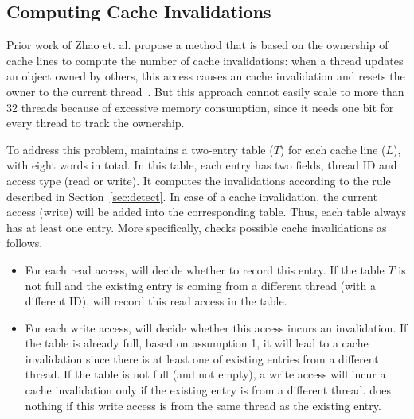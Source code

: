 \subsection{Computing Cache Invalidations}
\label{sec:computeinvalidations}

Prior work of Zhao et. al. propose a method that is based on the ownership of cache lines to compute the number of cache invalidations: when a thread updates an object owned by others, this access causes an cache invalidation and resets the owner to the current thread~\cite{qinzhao}. But this approach cannot easily scale to more than 32 threads because of excessive memory consumption, since it needs one bit for every thread to track the ownership.  

To address this problem, \Cheetah{} maintains a two-entry table ($T$) for each cache line ($L$), with eight words in total. In this table, each entry has two fields, thread ID and access type (read or write). It computes the invalidations according to the rule described in Section~\ref{sec:detect}. In case of a cache invalidation, the current access (write) will be added into the corresponding table. Thus, each table always has at least one entry. More specifically, \cheetah{} checks possible cache invalidations as follows.

\begin{itemize}
\item
For each read access, \cheetah{} will decide whether to record this entry. If the table $T$ is not full and the existing entry is coming from a different thread (with a different ID), \cheetah{} will record this read access in the table.
  
  \item
  For each write access, \cheetah{} will decide whether this access incurs an invalidation. If the table is already full, based on assumption 1, it will lead to a cache invalidation since there is at least one of existing entries from a different thread. If the table is not full (and not empty), a write access will incur a cache invalidation only if the existing entry is from a different thread. \cheetah{} does nothing if this write access is from the same thread as the existing entry. 
  
\end{itemize}
     
